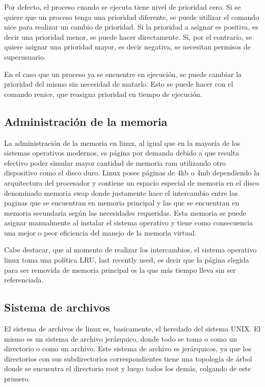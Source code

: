 \documentclass[a4paper, 12pt]{article}
\begin{document}
Por defecto, el proceso cuando se ejecuta tiene nivel de prioridad cero. Si se quiere que un proceso tenga una prioridad diferente, se puede utilizar el comando nice para realizar un cambio de prioridad. Si la prioridad a asignar es positiva, es decir una prioridad menor, se puede hacer directamente. Si, por el contrario, se quiere asignar una prioridad mayor, es decir negativa, se necesitan permisos de superusuario.

En el caso que un proceso ya se encuentre en ejecuci\'on, se puede cambiar la prioridad del mismo sin necesidad de matarlo. Esto se puede hacer con el comando renice, que reasigna prioridad en tiempo de ejecuci\'on.

\subsection*{Administraci\'on de la memoria}

La administraci\'on de la memoria en linux, al igual que en la mayor\'ia de los sistemas operativos modernos, es p\'agina por demanda debido a que resulta efectivo poder simular mayor cantidad de memoria ram utilizando otro dispositivo como el disco duro. Linux posee p\'aginas de 4kb o 4mb dependiendo la arquitectura del procesador y contiene un espacio especial de memoria en el disco denominado memoria swap donde justamente hace el intercambio entre las paginas que se encuentran en memoria principal y las que se encuentran en memoria secundaria seg\'un las necesidades requeridas. Esta memoria se puede asignar manualmente al instalar el sistema operativo y tiene como consecuencia una mejor o peor eficiencia del manejo de la memoria virtual. 

Cabe destacar, que al momento de realizar los intercambios, el sistema operativo linux toma una pol\'itica LRU, last recently used, es decir que la p\'agina elegida para ser removida de memoria principal es la que m\'as tiempo lleva sin ser referenciada.

\subsection*{Sistema de archivos}

El sistema de archivos de linux es, basicamente, el heredado del sistema UNIX. El mismo es un sistema de archivo jer\'arquico, donde todo se toma o como un directorio o como un archivo. Este sistema de archivo es jer\'arquicos, ya que los directorios con sus subdirectorios correspondientes tiene una topolog\'ia de \'arbol donde se encuentra el directorio root y luego todos los dem\'as, colgando de este primero. 
\end{document}
